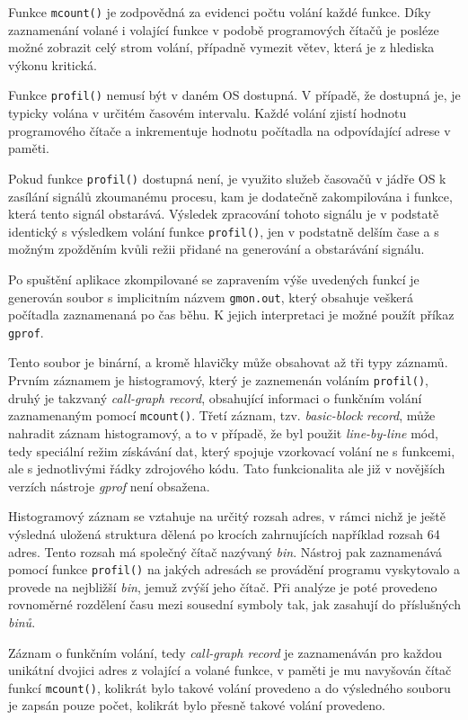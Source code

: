 \documentclass[czech,BP]{thesiskiv}
\begin{document}
Funkce \texttt{mcount()} je zodpovědná za evidenci počtu volání každé funkce. Díky zaznamenání volané i volající funkce v podobě programových čítačů je posléze možné zobrazit celý strom volání, případně vymezit větev, která je z hlediska výkonu kritická.

Funkce \texttt{profil()} nemusí být v daném OS dostupná. V případě, že dostupná je, je typicky volána v určitém časovém intervalu. Každé volání zjistí hodnotu programového čítače a inkrementuje hodnotu počítadla na odpovídající adrese v paměti.

Pokud funkce \texttt{profil()} dostupná není, je využito služeb časovačů v jádře OS k zasílání signálů zkoumanému procesu, kam je dodatečně zakompilována i funkce, která tento signál obstarává. Výsledek zpracování tohoto signálu je v podstatě identický s výsledkem volání funkce \texttt{profil()}, jen v podstatně delším čase a s možným zpožděním kvůli režii přidané na generování a obstarávání signálu.

Po spuštění aplikace zkompilované se zapravením výše uvedených funkcí je generován soubor s implicitním názvem \texttt{gmon.out}, který obsahuje veškerá počítadla zaznamenaná po čas běhu. K jejich interpretaci je možné použít příkaz \texttt{gprof}.

Tento soubor je binární, a kromě hlavičky může obsahovat až tři typy záznamů. Prvním záznamem je histogramový, který je zaznemenán voláním \texttt{profil()}, druhý je takzvaný \emph{call-graph record}, obsahující informaci o funkčním volání zaznamenaným pomocí \texttt{mcount()}. Třetí záznam, tzv. \emph{basic-block record}, může nahradit záznam histogramový, a to v případě, že byl použit \emph{line-by-line} mód, tedy speciální režim získávání dat, který spojuje vzorkovací volání ne s funkcemi, ale s jednotlivými řádky zdrojového kódu. Tato funkcionalita ale již v novějších verzích nástroje \emph{gprof} není obsažena\cite{gprof1}.

Histogramový záznam se vztahuje na určitý rozsah adres, v rámci nichž je ještě výsledná uložená struktura dělená po krocích zahrnujících například rozsah 64 adres. Tento rozsah má společný čítač nazývaný \emph{bin}. Nástroj pak zaznamenává pomocí funkce \texttt{profil()} na jakých adresách se provádění programu vyskytovalo a provede  na nejbližší \emph{bin}, jemuž zvýší jeho čítač. Při analýze je poté provedeno rovnoměrné rozdělení času mezi sousední symboly tak, jak zasahují do příslušných \emph{binů}.

Záznam o funkčním volání, tedy \emph{call-graph record} je zaznamenáván pro každou unikátní dvojici adres z volající a volané funkce, v paměti je mu navyšován čítač funkcí \texttt{mcount()}, kolikrát bylo takové volání provedeno a do výsledného souboru je zapsán pouze počet, kolikrát bylo přesně takové volání provedeno.
\end{document}
